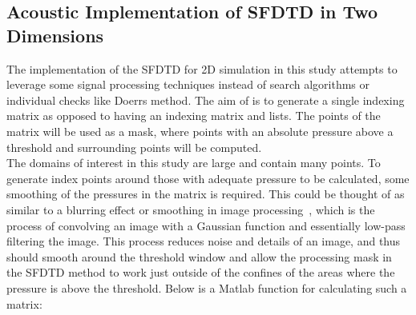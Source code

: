 \subsection{Acoustic Implementation of SFDTD in Two Dimensions}
The implementation of the SFDTD for 2D simulation in this study attempts to leverage some signal processing techniques instead of search algorithms or individual checks like Doerrs method. The aim of is to generate a single indexing matrix as opposed to having an indexing matrix and lists. The points of the matrix will be used as a mask, where points with an absolute pressure above a threshold and surrounding points will be computed.\\

The domains of interest in this study are large and contain many points. To generate index points around those with adequate pressure to be calculated, some smoothing of the pressures in the matrix is required. This could be thought of as similar to a blurring effect or smoothing in image processing~\cite{Blanchet2006}, which is the process of convolving an image with a Gaussian function and essentially low-pass filtering the image. This process reduces noise and details of an image, and thus should smooth around the threshold window and allow the processing mask in the SFDTD method to work just outside of the confines of the areas where the pressure is above the threshold. Below is a Matlab function for calculating such a matrix:\\




